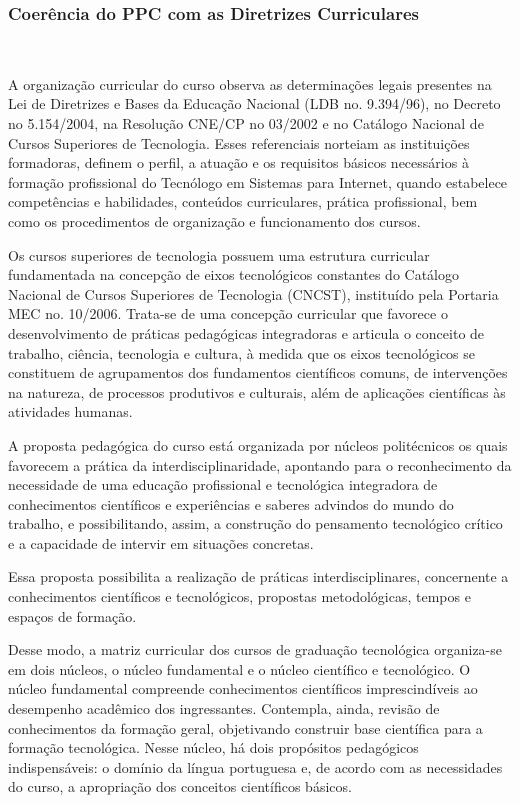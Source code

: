 \subsubsection{Coerência do PPC com as Diretrizes Curriculares}\

	A organização curricular do curso observa as determinações legais presentes na Lei de Diretrizes e Bases da Educação Nacional (LDB no. 9.394/96), no Decreto no 5.154/2004, na Resolução CNE/CP no 03/2002 e no Catálogo Nacional de Cursos Superiores de Tecnologia. Esses referenciais norteiam as instituições formadoras, definem o perfil, a atuação e os requisitos básicos necessários à formação profissional do Tecnólogo em Sistemas para Internet, quando estabelece competências e habilidades, conteúdos curriculares, prática profissional, bem como os procedimentos de organização e funcionamento dos cursos.

	Os cursos superiores de tecnologia possuem uma estrutura curricular fundamentada na concepção de eixos tecnológicos constantes do Catálogo Nacional de Cursos Superiores de Tecnologia (CNCST), instituído pela Portaria MEC no. 10/2006. Trata-se de uma concepção curricular que favorece o desenvolvimento de práticas pedagógicas integradoras e articula o conceito de trabalho, ciência, tecnologia e cultura, à medida que os eixos tecnológicos se constituem de agrupamentos dos fundamentos científicos comuns, de intervenções na natureza, de processos produtivos e culturais, além de aplicações científicas às atividades humanas.

	A proposta pedagógica do curso está organizada por núcleos politécnicos os quais favorecem a prática da interdisciplinaridade, apontando para o reconhecimento da necessidade de uma educação profissional e tecnológica integradora de conhecimentos científicos e experiências e saberes advindos do mundo do trabalho, e possibilitando, assim, a construção do pensamento tecnológico crítico e a capacidade de intervir em situações concretas.

	Essa proposta possibilita a realização de práticas interdisciplinares, concernente a conhecimentos científicos e tecnológicos, propostas metodológicas, tempos e espaços de formação.

	Desse modo, a matriz curricular dos cursos de graduação tecnológica organiza-se em dois núcleos, o núcleo fundamental e o núcleo científico e tecnológico. O núcleo fundamental compreende conhecimentos científicos imprescindíveis ao desempenho acadêmico dos ingressantes. Contempla, ainda, revisão de conhecimentos da formação geral, objetivando construir base científica para a formação tecnológica. Nesse núcleo, há dois propósitos pedagógicos indispensáveis: o domínio da língua portuguesa e, de acordo com as necessidades do curso, a apropriação dos conceitos científicos básicos.

